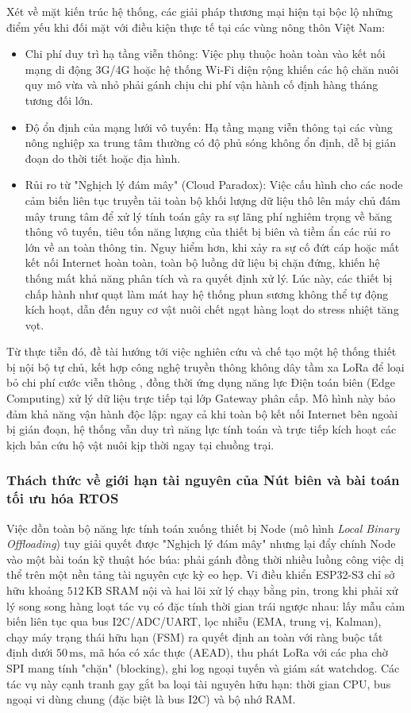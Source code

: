 Xét về mặt kiến trúc hệ thống, các giải pháp thương mại hiện tại bộc lộ những điểm yếu khi đối mặt với điều kiện thực tế tại các vùng nông thôn Việt Nam:
\begin{itemize}
    \item Chi phí duy trì hạ tầng viễn thông: Việc phụ thuộc hoàn toàn vào kết nối mạng di động 3G/4G hoặc hệ thống Wi-Fi diện rộng khiến các hộ chăn nuôi quy mô vừa và nhỏ phải gánh chịu chi phí vận hành cố định hàng tháng tương đối lớn.
    \item Độ ổn định của mạng lưới vô tuyến: Hạ tầng mạng viễn thông tại các vùng nông nghiệp xa trung tâm thường có độ phủ sóng không ổn định, dễ bị gián đoạn do thời tiết hoặc địa hình.
    \item Rủi ro từ "Nghịch lý đám mây" (Cloud Paradox): Việc cấu hình cho các node cảm biến liên tục truyền tải toàn bộ khối lượng dữ liệu thô lên máy chủ đám mây trung tâm để xử lý tính toán gây ra sự lãng phí nghiêm trọng về băng thông vô tuyến, tiêu tốn năng lượng của thiết bị biên và tiềm ẩn các rủi ro lớn về an toàn thông tin. Nguy hiểm hơn, khi xảy ra sự cố đứt cáp hoặc mất kết nối Internet hoàn toàn, toàn bộ luồng dữ liệu bị chặn đứng, khiến hệ thống mất khả năng phân tích và ra quyết định xử lý. Lúc này, các thiết bị chấp hành như quạt làm mát hay hệ thống phun sương không thể tự động kích hoạt, dẫn đến nguy cơ vật nuôi chết ngạt hàng loạt do stress nhiệt tăng vọt.
\end{itemize}
Từ thực tiễn đó, đề tài hướng tới việc nghiên cứu và chế tạo một hệ thống thiết bị nội bộ tự chủ, kết hợp công nghệ truyền thông không dây tầm xa LoRa để loại bỏ chi phí cước viễn thông , đồng thời ứng dụng năng lực Điện toán biên (Edge Computing) xử lý dữ liệu trực tiếp tại lớp Gateway phân cấp. Mô hình này bảo đảm khả năng vận hành độc lập: ngay cả khi toàn bộ kết nối Internet bên ngoài bị gián đoạn, hệ thống vẫn duy trì năng lực tính toán và trực tiếp kích hoạt các kịch bản cứu hộ vật nuôi kịp thời ngay tại chuồng trại.

\subsubsection{Thách thức về giới hạn tài nguyên của Nút biên và bài toán tối ưu hóa RTOS}
Việc dồn toàn bộ năng lực tính toán xuống thiết bị Node (mô hình \textit{Local Binary Offloading}) tuy giải quyết được "Nghịch lý đám mây" nhưng lại đẩy chính Node vào một bài toán kỹ thuật hóc búa: phải gánh đồng thời nhiều luồng công việc dị thể trên một nền tảng tài nguyên cực kỳ eo hẹp. Vi điều khiển ESP32-S3 chỉ sở hữu khoảng $512\,\text{KB}$ SRAM nội và hai lõi xử lý chạy bằng pin, trong khi phải xử lý song song hàng loạt tác vụ có đặc tính thời gian trái ngược nhau: lấy mẫu cảm biến liên tục qua bus I2C/ADC/UART, lọc nhiễu (EMA, trung vị, Kalman), chạy máy trạng thái hữu hạn (FSM) ra quyết định an toàn với ràng buộc tất định dưới $50\,\text{ms}$, mã hóa có xác thực (AEAD), thu phát LoRa với các pha chờ SPI mang tính "chặn" (blocking), ghi log ngoại tuyến và giám sát watchdog. Các tác vụ này cạnh tranh gay gắt ba loại tài nguyên hữu hạn: thời gian CPU, bus ngoại vi dùng chung (đặc biệt là bus I2C) và bộ nhớ RAM.

